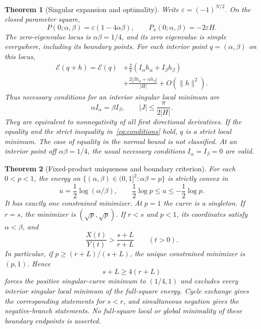 \documentclass[11pt,a4paper]{article}
\newtheorem{theorem}{Theorem}
\theoremstyle{remark}
\newcommand{\E}{\mathcal E}
\newcommand{\eps}{\varepsilon}
\begin{document}
\begin{theorem}[Singular expansion and optimality]\label{thm:singular}
Write $\eps=(-1)^{N/2}$. On the closed parameter square,
\begin{equation}\label{eq:coefficients}
 P(0;\alpha,\beta)=\eps(1-4\alpha\beta),\qquad
 P_x(0;\alpha,\beta)=-2\eps H.
\end{equation}
The zero-eigenvalue locus is $\alpha\beta=1/4$, and its zero eigenvalue
is simple everywhere, including its boundary points.
For each interior point $q=(\alpha,\beta)$ on this locus,
\begin{equation}\label{eq:expansion}
 \begin{split}
 \E(q+h)=\E(q)&+\frac2\pi(I_\alpha h_\alpha+I_\beta h_\beta)\\
 &+\frac{2|\beta h_\alpha+\alpha h_\beta|}{|H|}
       +O(\|h\|^2).
 \end{split}
\end{equation}
Thus necessary conditions for an interior singular local minimum are
\begin{equation}\label{eq:conditions}
 \alpha I_\alpha=\beta I_\beta,\qquad
 |J|\leq\frac{\pi}{2|H|}.
\end{equation}
They are equivalent to nonnegativity of all first directional
derivatives. If the equality and the \emph{strict} inequality
in~\eqref{eq:conditions} hold, $q$ is a strict local minimum.
The case of equality in the normal bound is not classified.
At an interior point off $\alpha\beta=1/4$, the usual necessary
conditions $I_\alpha=I_\beta=0$ are valid.
\end{theorem}

\begin{theorem}[Fixed-product uniqueness and boundary criterion]\label{thm:product}
For each $0<p<1$, the energy on
$\{(\alpha,\beta)\in(0,1]^2:\alpha\beta=p\}$ is strictly convex in
\[
 u=\frac12\log(\alpha/\beta),\qquad
 \frac12\log p\leq u\leq-\frac12\log p .
\]
It has exactly one constrained minimizer. At $p=1$ the curve is a
singleton. If $r=s$, the minimizer is $(\sqrt p,\sqrt p)$.
If $r<s$ and $p<1$, its coordinates satisfy $\alpha<\beta$, and
\begin{equation}\label{eq:ratio-bound}
 \frac{X(t)}{Y(t)}>\frac{s+L}{r+L}\qquad(t>0).
\end{equation}
In particular, if $p\geq(r+L)/(s+L)$, the unique constrained
minimizer is $(p,1)$. Hence
\begin{equation}\label{eq:length-bound}
 s+L\geq4(r+L)
\end{equation}
forces the positive singular-curve minimum to $(1/4,1)$ and excludes
every interior singular local minimum of the full-square energy.
Cycle exchange gives the corresponding statements for $s<r$,
and simultaneous negation gives the negative-branch statements.
No full-square local or global minimality of these boundary
endpoints is asserted.
\end{theorem}
\end{document}
